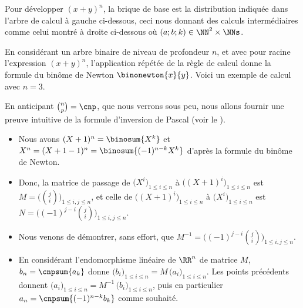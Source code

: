 Pour développer $(x + y)^n$, la brique de base est la distribution indiquée dans l'arbre de calcul à gauche ci-dessous, ceci nous donnant des calculs intermédiaires comme celui montré à droite ci-dessous où $(a;b;k) \in \NN^2 \times \NNs$.

%
            {\intertree}{}

En considérant un arbre binaire de niveau de profondeur $n$, et avec pour racine l'expression $(x + y)^n$, l'application répétée de la règle de calcul donne la formule du binôme de Newton
$\binonewton{x}{y}$.
%
Voici un exemple de calcul avec $n=3$.





\begin{remark} \label{easy-pascal-inv}
	En anticipant $\binom{n}{p} = \cnp$, que nous verrons sous peu, nous allons fournir une preuve intuitive de la formule d'inversion de Pascal (voir le  ).
	\begin{itemize}
		\item Nous avons
		$(X + 1)^n = \binosum{X^k}$
		et
		$X^n = (X + 1 - 1)^n = \binosum{(-1)^{n-k}X^k}$
		d'après la formule du binôme de Newton.
		

		\item Donc, la matrice de passage de
		$\big( X^i \big)_{1 \leq i \leq n}$
		à
		$\big( (X + 1)^i \big)_{1 \leq i \leq n}$
		est
		$M = \big( \binom{j}{i} \big)_{1 \leq i, j \leq n}$,
		et celle de
		$\big( (X + 1)^i \big)_{1 \leq i \leq n}$
		à
		$\big( X^i \big)_{1 \leq i \leq n}$
		est
		$N = \big( (-1)^{j-i} \binom{j}{i} \big)_{1 \leq i, j \leq n}$.
		

		\item Nous venons de démontrer, sans effort, que $M^{-1} = \big( (-1)^{j-i} \binom{j}{i} \big)_{1 \leq i, j \leq n}$.
		

		\item En considérant l'endomorphisme linéaire de $\RR^n$ de matrice $M$, 
		$b_n = \cnpsum{a_k}$ 
		donne
		$\big( b_i \big)_{1 \leq i \leq n} = M \, \big( a_i \big)_{1 \leq i \leq n}$.
		Les points précédents donnent
		$\big( a_i \big)_{1 \leq i \leq n} = M^{-1} \, \big( b_i \big)_{1 \leq i \leq n}$,
		puis en particulier
		$a_n = \cnpsum{(-1)^{n-k} b_k}$ comme souhaité.
	\end{itemize}
\end{remark}
